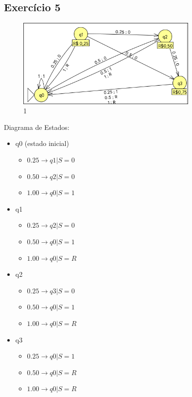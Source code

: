 \documentclass[a4paper,12pt]{article}
\begin{document}
    \subsection{Exercício 5}
        \begin{figure}[H]
            \centering
            \includegraphics[width=0.8\textwidth]{Aula07/Images/Exercicio1.png}
            \caption*{1}
        \end{figure}
        Diagrama de Estados:
        \begin{itemize}
            \item q0 (estado inicial)
                \begin{itemize}
                    \item $0.25 \to q1 | S = 0$
                    \item $0.50 \to q2 | S = 0$
                    \item $1.00 \to q0 | S = 1$
                \end{itemize}
            \item q1
                \begin{itemize}
                    \item $0.25 \to q2 | S = 0$
                    \item $0.50 \to q0 | S = 1$
                    \item $1.00 \to q0 | S = R$
                \end{itemize}
            \item q2
                \begin{itemize}
                    \item $0.25 \to q3 | S = 0$
                    \item $0.50 \to q0 | S = 1$
                    \item $1.00 \to q0 | S = R$
                \end{itemize}
            \item q3
                \begin{itemize}
                    \item $0.25 \to q0 | S = 1$
                    \item $0.50 \to q0 | S = R$
                    \item $1.00 \to q0 | S = R$
                \end{itemize}                
        \end{itemize}
    
\end{document}
